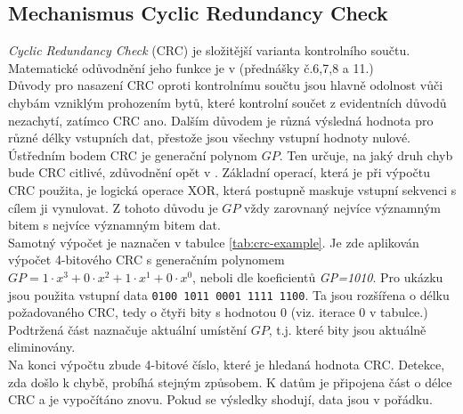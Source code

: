 \subsection{Mechanismus Cyclic Redundancy Check}
\label{subsec:crc}
\textit{Cyclic Redundancy Check} (CRC) je složitější varianta kontrolního součtu. Matematické odůvodnění jeho funkce je v \cite{crc-prednasky} (přednášky č.6,7,8 a 11.)\\
Důvody pro nasazení CRC oproti kontrolnímu součtu jsou hlavně odolnost vůči chybám vzniklým prohozením bytů, které kontrolní součet z evidentních důvodů nezachytí, zatímco CRC ano. Dalším důvodem je různá výsledná hodnota pro různé délky vstupních dat, přestože jsou všechny vstupní hodnoty nulové.\\
Ústředním bodem CRC je generační polynom $GP$. Ten určuje, na jaký druh chyb bude CRC citlivé, zdůvodnění opět v \cite{crc-prednasky}. Základní operací, která je při výpočtu CRC použita, je logická operace XOR, která postupně maskuje vstupní sekvenci s cílem ji vynulovat. Z tohoto důvodu je $GP$ vždy zarovnaný nejvíce významným bitem s nejvíce významným bitem dat.\\
Samotný výpočet je naznačen v tabulce \ref{tab:crc-example}. Je zde aplikován výpočet 4-bitového CRC s generačním polynomem $GP=1 \cdot x^3 + 0 \cdot x^2 + 1 \cdot x^1 + 0 \cdot x^0$, neboli dle koeficientů \textit{GP=1010}. Pro ukázku jsou použita vstupní data \texttt{0100 1011 0001 1111 1100}. Ta jsou rozšířena o délku požadovaného CRC, tedy o čtyři bity s hodnotou 0 (viz. iterace 0 v tabulce.) Podtržená část naznačuje aktuální umístění $GP$, t.j. které bity jsou aktuálně eliminovány.\\
Na konci výpočtu zbude 4-bitové číslo, které je hledaná hodnota CRC. Detekce, zda došlo k chybě, probíhá stejným způsobem. K datům je připojena část o délce CRC a je vypočítáno znovu. Pokud se výsledky shodují, data jsou v pořádku.\\
